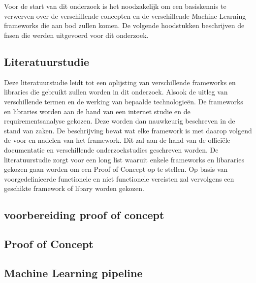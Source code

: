 
\chapter{}%
\label{ch:methodologie}


Voor de start van dit onderzoek is het noodzakelijk om een basiskennis te verwerven over de verschillende concepten en de verschillende Machine Learning frameworks die aan bod zullen komen. De volgende hoodstukken beschrijven de fasen die werden uitgevoerd voor dit onderzoek.

\section*{Literatuurstudie}
Deze literatuurstudie leidt tot een oplijsting van verschillende frameworks en libraries die gebruikt zullen worden in dit onderzoek. Alsook de uitleg van verschillende termen en de werking van bepaalde technologieën.
De frameworks en libraries worden aan de hand van een internet studie en de requirementsanalyse gekozen. Deze worden dan nauwkeurig beschreven in de stand van zaken. De beschrijving bevat wat elke framework is met daarop volgend de voor en nadelen van het framework.
Dit zal aan de hand van de officiële documentatie en verschillende onderzoekstudies geschreven worden.
De literatuurstudie zorgt voor een long list waaruit enkele frameworks en libararies gekozen gaan worden om een Proof of Concept op te stellen.
Op basis van voorgedefinieerde functionele en niet functionele vereisten zal vervolgens een geschikte framework of libary worden gekozen.
\section*{voorbereiding proof of concept}
\section*{Proof of Concept}
\section*{Machine Learning pipeline}
